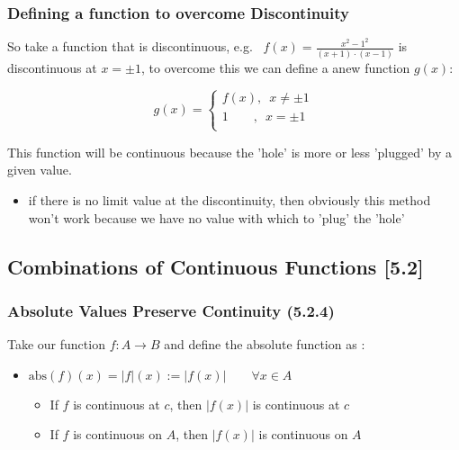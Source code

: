\documentclass[
]{article}
\begin{document}
\hypertarget{header-n3936}{%
\subsubsection{Defining a function to overcome
Discontinuity}\label{header-n3936}}

So take a function that is discontinuous, e.g.
\(\enspace f(x) = \frac{x^2-1^2}{(x+1)\cdot (x-1)}\) is discontinuous at
\(x = \pm 1\), to overcome this we can define a anew function \(g(x)\):

\[g(x) = 
  \begin{cases}
    f\left( x \right) , \enspace
   x\neq \pm1\\ 
   1\quad \enspace \enspace  , \enspace   x = \pm 1\\
      \end{cases}\]

This function will be continuous because the 'hole' is more or less
'plugged' by a given value.

\begin{itemize}
\item
  if there is no limit value at the discontinuity, then obviously this
  method won't work because we have no value with which to 'plug' the
  'hole'
\end{itemize}

\hypertarget{header-n3943}{%
\subsection{Combinations of Continuous Functions
{[}5.2{]}}\label{header-n3943}}

\hypertarget{header-n3944}{%
\subsubsection{Absolute Values Preserve Continuity
(5.2.4)}\label{header-n3944}}

Take our function \(f: A \rightarrow B\) and define the absolute
function as :

\begin{itemize}
\item
  \(\text{abs}(f)(x) = \left| f \right|(x) := \left| f(x) \right| \qquad\forall x \in A\)

  \begin{itemize}
  \item
    If \(f\) is continuous at \(c\), then \(\left| f(x) \right|\) is
    continuous at \(c\) 
  \item
    If \(f\) is continuous on \(A\), then \(\left| f(x) \right|\) is
    continuous on \(A\) 
  \end{itemize}
\end{itemize}
\end{document}
